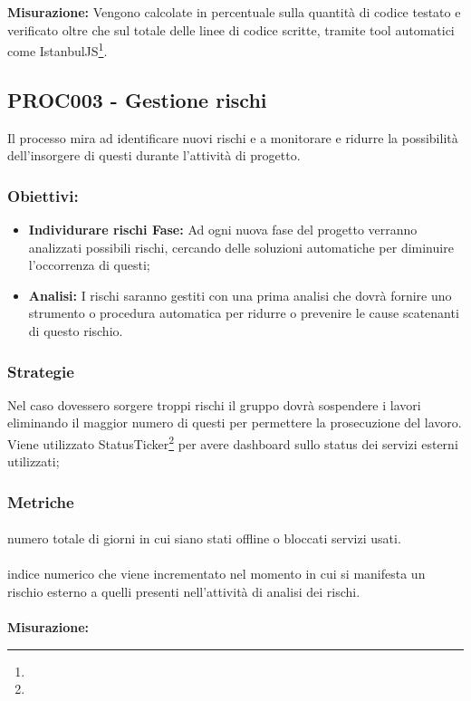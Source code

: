 \documentclass[PianoDiQualifica.tex]{subfiles}
\begin{document}
\textbf{Misurazione:}
Vengono calcolate in percentuale sulla quantità di codice testato e verificato oltre che sul totale delle linee di codice scritte, tramite tool automatici come IstanbulJS\footnote{}.


\subsection{PROC003 - Gestione rischi}
Il processo mira ad identificare nuovi rischi e a monitorare e ridurre la possibilità dell'insorgere di questi durante l'attività di progetto.
\subsubsection{Obiettivi:}
\begin{itemize}
	\item \textbf{Individurare rischi Fase:} Ad ogni nuova fase del progetto verranno analizzati possibili rischi, cercando delle soluzioni automatiche per diminuire l'occorrenza di questi;
	\item \textbf{Analisi:} I rischi saranno gestiti con una prima analisi che dovrà fornire uno strumento o procedura automatica per ridurre o prevenire le cause scatenanti di questo rischio.
\end{itemize}
\subsubsection{Strategie}
Nel caso dovessero sorgere troppi rischi il gruppo dovrà sospendere i lavori eliminando il maggior numero di questi per permettere la prosecuzione del lavoro.
Viene utilizzato StatusTicker\footnote{} per avere dashboard sullo status dei servizi esterni utilizzati;

\subsubsection{Metriche}
\paragraph{}
 numero totale di giorni in cui siano stati offline o bloccati servizi usati.

\paragraph{}
 indice numerico che viene incrementato nel momento in cui si manifesta un
rischio esterno a quelli presenti nell'attività di analisi dei rischi.\\ \\
\textbf{Misurazione:}
\end{document}
